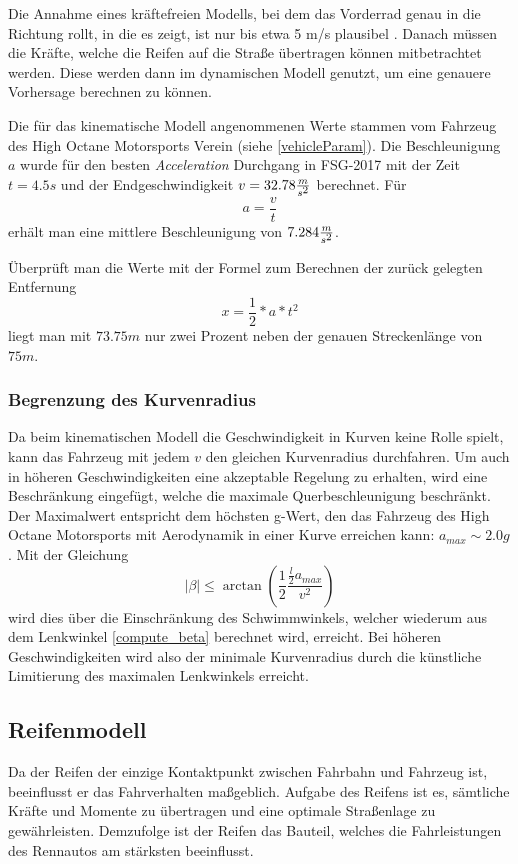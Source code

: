 \documentclass{like}
\begin{document}
Die Annahme eines kräftefreien Modells, bei dem das Vorderrad genau in die Richtung rollt, in die es zeigt, ist nur bis etwa 5 m/s plausibel \cite{rajamani2011vehicle}. Danach müssen die Kräfte, welche die Reifen auf die Straße übertragen können mitbetrachtet werden. Diese werden dann im dynamischen Modell genutzt, um eine genauere Vorhersage berechnen zu können.

Die für das kinematische Modell angenommenen Werte stammen vom Fahrzeug des High Octane Motorsports Verein (siehe \ref{vehicleParam}). Die Beschleunigung \(a\) wurde für den besten \textit{Acceleration} Durchgang in FSG-2017 mit der Zeit $t = 4.5s$ und der Endgeschwindigkeit $v = 32.78 \frac{m}{s\textsuperscript{2}}$ berechnet. Für 
\begin{equation}
a = \frac{v}{t}  \label{long_acc_kin}
\end{equation}
erhält man eine mittlere Beschleunigung von $7.284 \frac{m}{s\textsuperscript{2}} $.

Überprüft man die Werte mit der Formel zum Berechnen der zurück gelegten Entfernung 
\begin{equation}
x = \frac{1}{2} * a * t^2  
\end{equation}
liegt man mit \(73.75m\) nur zwei Prozent neben der genauen Streckenlänge von \(75m\).

\subsubsection*{Begrenzung des Kurvenradius}
\label{betaMax}
Da beim kinematischen Modell die Geschwindigkeit in Kurven keine Rolle spielt, kann das Fahrzeug mit jedem \(v\) den gleichen Kurvenradius durchfahren. Um auch in höheren Geschwindigkeiten eine akzeptable Regelung zu erhalten, wird eine Beschränkung eingefügt, welche die maximale Querbeschleunigung beschränkt. Der Maximalwert entspricht dem höchsten g-Wert, den das Fahrzeug des High Octane Motorsports mit Aerodynamik in einer Kurve erreichen kann: $a_{max} \sim 2.0g$. 
Mit der Gleichung
\begin{equation}
	|\beta| \leq \arctan(\frac{1}{2} \frac{\frac{l}{2} a_{max}}{v^2})
\end{equation}
wird dies über die Einschränkung des Schwimmwinkels, welcher wiederum aus dem Lenkwinkel \ref{compute_beta} berechnet wird, erreicht. Bei höheren Geschwindigkeiten wird also der minimale Kurvenradius durch die künstliche Limitierung des maximalen Lenkwinkels erreicht. 


\subsection{Reifenmodell}
\label{tireModel}
Da der Reifen der einzige Kontaktpunkt zwischen Fahrbahn und Fahrzeug ist, beeinflusst er das Fahrverhalten maßgeblich. Aufgabe des Reifens ist es, sämtliche Kräfte und Momente zu übertragen und eine optimale Straßenlage zu gewährleisten. Demzufolge ist der Reifen das Bauteil, welches die Fahrleistungen des Rennautos am stärksten beeinflusst.
\end{document}
